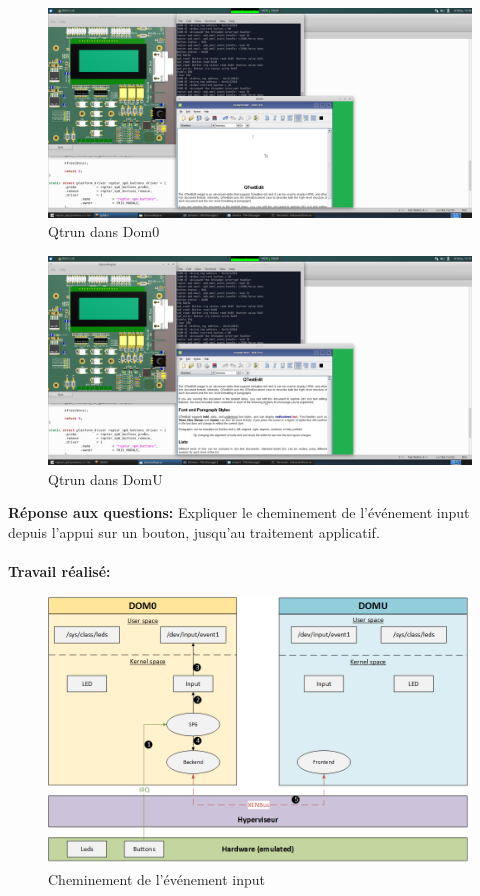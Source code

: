 \begin{figure}[H]
	\begin{center}
		\includegraphics[width=16cm]{img/dom02.png}
		\caption{Qtrun dans Dom0}
		\label{qtrun2}
	\end{center}
\end{figure}
\begin{figure}[H]
	\begin{center}
		\includegraphics[width=16cm]{img/dom03.png}
		\caption{Qtrun dans DomU}
		\label{qtrun3}
	\end{center}
\end{figure}
\textbf{Réponse aux questions: }Expliquer le cheminement de l'événement input depuis l'appui sur un bouton, jusqu'au traitement applicatif.\\\\
\textbf{Travail réalisé: }
\begin{figure}[H]
	\begin{center}
		\includegraphics[width=17cm]{img/virt2.png}
		\caption{Cheminement de l'événement input}
		\label{virt2}
	\end{center}
\end{figure}
